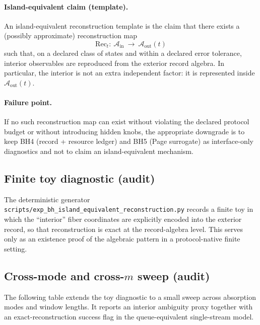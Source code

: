 \paragraph{Island-equivalent claim (template).}
\AuditTag An island-equivalent reconstruction template is the claim that there exists a (possibly approximate)
reconstruction map
\[
\mathrm{Rec}_t:\ \mathcal{A}_{\mathrm{in}}\ \longrightarrow\ \mathcal{A}_{\mathrm{out}}(t)
\]
such that, on a declared class of states and within a declared error tolerance, interior observables are reproduced
from the exterior record algebra.
In particular, the interior is not an extra independent factor: it is represented inside $\mathcal{A}_{\mathrm{out}}(t)$.

\paragraph{Failure point.}
\AuditTag If no such reconstruction map can exist without violating the declared protocol budget or without
introducing hidden knobs, the appropriate downgrade is to keep BH4 (record + resource ledger) and BH5 (Page surrogate)
as interface-only diagnostics and not to claim an island-equivalent mechanism.

\subsection{Finite toy diagnostic (audit)}
\label{subsec:bh6_toy_diagnostic}

\AuditTag The deterministic generator \texttt{scripts/exp\_bh\_island\_equivalent\_reconstruction.py}
records a finite toy in which the ``interior'' fiber coordinates are explicitly encoded into the exterior record,
so that reconstruction is exact at the record-algebra level.
This serves only as an existence proof of the algebraic pattern in a protocol-native finite setting.

%

\subsection{Cross-mode and cross-\texorpdfstring{$m$}{m} sweep (audit)}
\label{subsec:bh6_sweep}

\AuditTag The following table extends the toy diagnostic to a small sweep across absorption modes and window lengths.
It reports an interior ambiguity proxy together with an exact-reconstruction success flag in the queue-equivalent
single-stream model.

